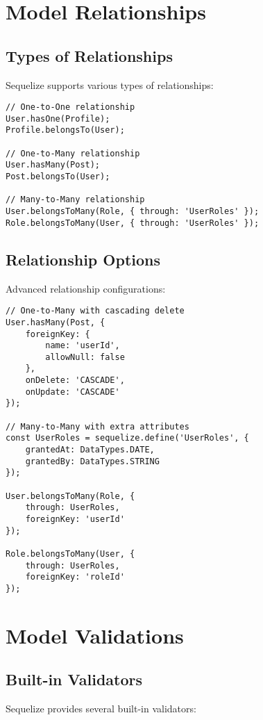 \documentclass[12pt,a4paper]{book}
\begin{document}
	\section{Model Relationships}
	
	\subsection{Types of Relationships}
	Sequelize supports various types of relationships:
	
	\begin{verbatim}
// One-to-One relationship
User.hasOne(Profile);
Profile.belongsTo(User);

// One-to-Many relationship
User.hasMany(Post);
Post.belongsTo(User);

// Many-to-Many relationship
User.belongsToMany(Role, { through: 'UserRoles' });
Role.belongsToMany(User, { through: 'UserRoles' });
	\end{verbatim}
	
	\subsection{Relationship Options}
	Advanced relationship configurations:
	
	\begin{verbatim}
// One-to-Many with cascading delete
User.hasMany(Post, {
	foreignKey: {
		name: 'userId',
		allowNull: false
	},
	onDelete: 'CASCADE',
	onUpdate: 'CASCADE'
});

// Many-to-Many with extra attributes
const UserRoles = sequelize.define('UserRoles', {
	grantedAt: DataTypes.DATE,
	grantedBy: DataTypes.STRING
});

User.belongsToMany(Role, { 
	through: UserRoles,
	foreignKey: 'userId'
});

Role.belongsToMany(User, { 
	through: UserRoles,
	foreignKey: 'roleId'
});
	\end{verbatim}
	
	\section{Model Validations}
	
	\subsection{Built-in Validators}
	Sequelize provides several built-in validators:
	
\end{document}
